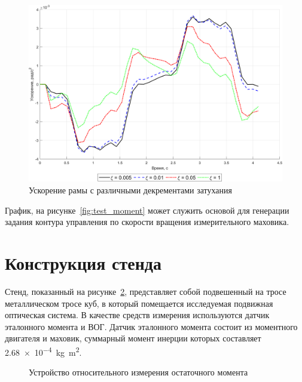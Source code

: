 \begin{figure}[ht]
	\centering
	\includegraphics[scale=0.7]{matlab/decrement.png}
	\caption{Ускорение рамы с различными декрементами затухания}
	\label{fig:decrement}
\end{figure}

График, на рисунке~\cref{fig:test_moment} может служить основой для генерации задания контура управления по скорости вращения измерительного маховика.



\section{Конструкция стенда}\label{sec:ch4/sect2}

Стенд, показанный на рисунке~\cref{fig:yoim}, представляет собой подвешенный на тросе металлическом тросе куб, в который помещается исследуемая подвижная оптическая система. В качестве средств измерения используются датчик эталонного момента и ВОГ. Датчик эталонного момента состоит из моментного двигателя и маховик, суммарный момент инерции которых составляет \SI{2.68e-4}{\kilogram\metre\squared}.

\begin{figure}[ht]
	\caption{Устройство относительного измерения остаточного момента}
	\label{fig:yoim}
\end{figure}

